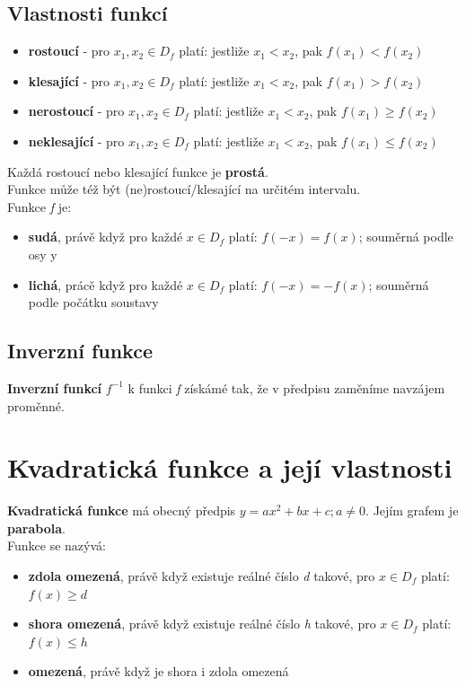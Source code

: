 \documentclass[12pt, a4paper]{article}
\begin{document}
\subsection*{Vlastnosti funkcí}
\begin{itemize}
\item \textbf{rostoucí} - pro $x_1,x_2 \in D_f$ platí: jestliže $x_1 < x_2$, pak $f(x_1)<f(x_2)$
\item \textbf{klesající} - pro $x_1,x_2 \in D_f$ platí: jestliže $x_1 < x_2$, pak $f(x_1)>f(x_2)$
\item \textbf{nerostoucí} - pro $x_1,x_2 \in D_f$ platí: jestliže $x_1 < x_2$, pak $f(x_1) \geq f(x_2)$
\item \textbf{neklesající} - pro $x_1,x_2 \in D_f$ platí: jestliže $x_1 < x_2$, pak $f(x_1) \leq f(x_2)$
\end{itemize}
Každá rostoucí nebo klesající funkce je \textbf{prostá}.\\
Funkce může též být (ne)rostoucí/klesající na určitém intervalu.\\
Funkce \textit{f} je:
\begin{itemize}
\item \textbf{sudá}, právě když pro každé $x \in D_f$ platí: $f(-x)=f(x)$; souměrná podle osy y
\item \textbf{lichá}, prácě když pro každé $x \in D_f$ platí: $f(-x)=-f(x)$; souměrná podle počátku soustavy
\end{itemize}

\subsection*{Inverzní funkce}
\textbf{Inverzní funkcí} $f^{-1}$ k funkci \textit{f} získámé tak, že v předpisu zaměníme navzájem proměnné.

\section{Kvadratická funkce a její vlastnosti}
\textbf{Kvadratická funkce} má obecný předpis $y=ax^2+bx+c; a \neq 0$. Jejím grafem je \textbf{parabola}.\\
Funkce se nazývá:
\begin{itemize}
\item \textbf{zdola omezená}, právě když existuje reálné číslo \textit{d} takové, pro $x \in D_f$ platí: $f(x) \geq d$
\item \textbf{shora omezená}, právě když existuje reálné číslo \textit{h} takové, pro $x \in D_f$ platí: $f(x) \leq h$
\item \textbf{omezená}, právě když je shora i zdola omezená
\end{itemize}
\end{document}
